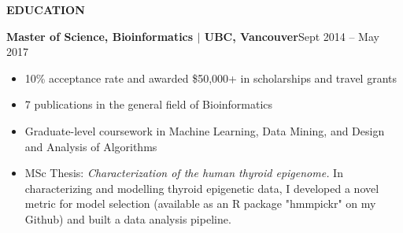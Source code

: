 \documentclass{res}
\renewcommand{\section}[1]{%
  \vspace{0.3in}%
  \centerline{\uppercase{\bf{#1}}}%
  \vspace{-6pt}}
\begin{document}
\begin{resume}
\vspace{-1em}
\section{Education}
{\bf Master of Science, Bioinformatics $|$ UBC, Vancouver}\hfill{Sept 2014 -- May 2017}
\begin{itemize}
  \item 10\% acceptance rate and awarded \$50,000+ in scholarships and travel grants
  \item 7 publications in the general field of Bioinformatics
  \item Graduate-level coursework in Machine Learning, Data Mining, and Design and Analysis of Algorithms
  \item MSc Thesis: {\it Characterization of the human thyroid epigenome.}
  In characterizing and modelling thyroid epigenetic data, I developed a novel metric for model selection (available as an R package "hmmpickr" on my Github) and built a data analysis pipeline.
\end{itemize}

\pagebreak

\end{resume}
\end{document}

